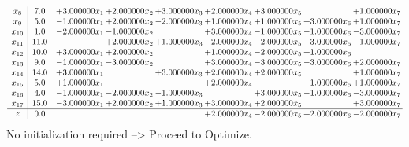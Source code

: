 \documentclass[10pt]{article}
\begin{document}
\[\begin{array}{c| c c@{\hskip 2pt} c@{\hskip 2pt} c@{\hskip 2pt} c@{\hskip 2pt} c@{\hskip 2pt} c@{\hskip 2pt} c@{\hskip 2pt} }
 x_{8}   &  7.0 & + 3.000000 x_{1} & + 2.000000 x_{2} & + 3.000000 x_{3} & + 2.000000 x_{4} & + 3.000000 x_{5} &   & + 1.000000 x_{7}\\
 x_{9}   &  5.0 & -1.000000 x_{1} & + 2.000000 x_{2} & -2.000000 x_{3} & + 1.000000 x_{4} & + 1.000000 x_{5} & + 3.000000 x_{6} & + 1.000000 x_{7}\\
 x_{10}   &  1.0 & -2.000000 x_{1} & -1.000000 x_{2} &   & + 3.000000 x_{4} & -1.000000 x_{5} & -1.000000 x_{6} & -3.000000 x_{7}\\
 x_{11}   &  11.0  &   & + 2.000000 x_{2} & + 1.000000 x_{3} & -2.000000 x_{4} & -2.000000 x_{5} & -3.000000 x_{6} & -1.000000 x_{7}\\
 x_{12}   &  10.0 & + 3.000000 x_{1} & + 2.000000 x_{2} &   & + 1.000000 x_{4} & -2.000000 x_{5} & + 1.000000 x_{6} &   \\
 x_{13}   &  9.0 & -1.000000 x_{1} & -3.000000 x_{2} &   & + 3.000000 x_{4} & -3.000000 x_{5} & -3.000000 x_{6} & + 2.000000 x_{7}\\
 x_{14}   &  14.0 & + 3.000000 x_{1} &   & + 3.000000 x_{3} & + 2.000000 x_{4} & + 2.000000 x_{5} &   & + 1.000000 x_{7}\\
 x_{15}   &  5.0 & + 1.000000 x_{1} &    &   & + 2.000000 x_{4} &   & -1.000000 x_{6} & + 1.000000 x_{7}\\
 x_{16}   &  4.0 & -1.000000 x_{1} & -2.000000 x_{2} & -1.000000 x_{3} &   & + 3.000000 x_{5} & -1.000000 x_{6} & -3.000000 x_{7}\\
 x_{17}   &  15.0 & -3.000000 x_{1} & + 2.000000 x_{2} & + 1.000000 x_{3} & + 3.000000 x_{4} & + 2.000000 x_{5} &   & + 3.000000 x_{7}\\
\hline
z    &  0.0  &    &    &   & + 2.000000 x_{4} & -2.000000 x_{5} & + 2.000000 x_{6} & -2.000000 x_{7}\\
\end{array}\]
No initialization required --> Proceed to Optimize. 
\end{document}
